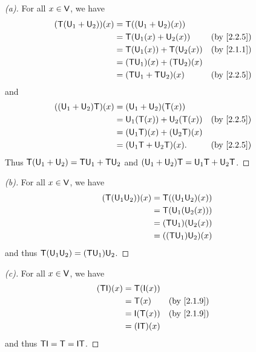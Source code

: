 \begin{proof}[(a)]
  For all \(x \in \mathsf{V}\), we have
  \begin{align*}
    (\T(\U_1 + \U_2))(x) & = \T((\U_1 + \U_2)(x))                                      \\
                         & = \T(\U_1(x) + \U_2(x))       &  & \text{(by \cref{2.2.5})} \\
                         & = \T(\U_1(x)) + \T(\U_2(x))   &  & \text{(by \cref{2.1.1})} \\
                         & = (\T \U_1)(x) + (\T \U_2)(x)                               \\
                         & = (\T \U_1 + \T \U_2)(x)      &  & \text{(by \cref{2.2.5})}
  \end{align*}
  and
  \begin{align*}
    ((\U_1 + \U_2) \T)(x) & = (\U_1 + \U_2)(\T(x))                                      \\
                          & = \U_1(\T(x)) + \U_2(\T(x))   &  & \text{(by \cref{2.2.5})} \\
                          & = (\U_1 \T)(x) + (\U_2 \T)(x)                               \\
                          & = (\U_1 \T + \U_2 \T)(x).     &  & \text{(by \cref{2.2.5})}
  \end{align*}
  Thus \(\mathsf{T}(\mathsf{U}_1 + \mathsf{U}_2) = \mathsf{T} \mathsf{U}_1 + \mathsf{T} \mathsf{U}_2\) and \((\mathsf{U}_1 + \mathsf{U}_2) \mathsf{T} = \mathsf{U}_1 \mathsf{T} + \mathsf{U}_2 \mathsf{T}\).
\end{proof}

\begin{proof}[(b)]
  For all \(x \in \mathsf{V}\), we have
  \begin{align*}
    (\mathsf{T} (\mathsf{U}_1 \mathsf{U}_2))(x) & = \mathsf{T}((\mathsf{U}_1 \mathsf{U}_2)(x))  \\
                        & = \mathsf{T}(\mathsf{U}_1(\mathsf{U}_2(x)))   \\
                        & = (\mathsf{T} \mathsf{U}_1)(\mathsf{U}_2(x))  \\
                        & = ((\mathsf{T} \mathsf{U}_1) \mathsf{U}_2)(x)
  \end{align*}
  and thus \(\mathsf{T} (\mathsf{U}_1 \mathsf{U}_2) = (\mathsf{T} \mathsf{U}_1) \mathsf{U}_2\).
\end{proof}

\begin{proof}[(c)]
  For all \(x \in \mathsf{V}\), we have
  \begin{align*}
    (\T \IT)(x) & = \T(\IT(x))                                \\
                & = \T(x)       &  & \text{(by \cref{2.1.9})} \\
                & = \IT(\T(x))  &  & \text{(by \cref{2.1.9})} \\
                & = (\IT \T)(x)
  \end{align*}
  and thus \(\T \IT = \T = \IT \T\).
\end{proof}

